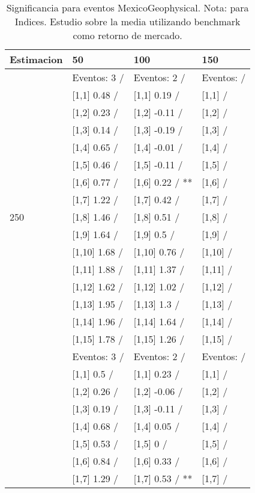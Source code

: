 \begin{table}

\caption{Significancia para eventos MexicoGeophysical. Nota: para Indices. Estudio sobre la media utilizando benchmark como retorno de mercado.}
\centering
\begin{tabular}[t]{llll}
\toprule
Estimacion & 50 & 100 & 150\\
\midrule
 & Eventos:  3 / & Eventos:  2 / & Eventos:   /\\
 & {}[1,1] 0.48  / & {}[1,1] 0.19  / & {}[1,1]  /\\
 & {}[1,2] 0.23  / & {}[1,2] -0.11  / & {}[1,2]  /\\
 & {}[1,3] 0.14  / & {}[1,3] -0.19  / & {}[1,3]  /\\
 & {}[1,4] 0.65  / & {}[1,4] -0.01  / & {}[1,4]  /\\
\addlinespace
 & {}[1,5] 0.46  / & {}[1,5] -0.11  / & {}[1,5]  /\\
 & {}[1,6] 0.77  / & {}[1,6] 0.22  / ** & {}[1,6]  /\\
 & {}[1,7] 1.22  / & {}[1,7] 0.42  / & {}[1,7]  /\\
250 & {}[1,8] 1.46  / & {}[1,8] 0.51  / & {}[1,8]  /\\
 & {}[1,9] 1.64  / & {}[1,9] 0.5  / & {}[1,9]  /\\
\addlinespace
 & {}[1,10] 1.68  / & {}[1,10] 0.76  / & {}[1,10]  /\\
 & {}[1,11] 1.88  / & {}[1,11] 1.37  / & {}[1,11]  /\\
 & {}[1,12] 1.62  / & {}[1,12] 1.02  / & {}[1,12]  /\\
 & {}[1,13] 1.95  / & {}[1,13] 1.3  / & {}[1,13]  /\\
 & {}[1,14] 1.96  / & {}[1,14] 1.64  / & {}[1,14]  /\\
\addlinespace
 & {}[1,15] 1.78  / & {}[1,15] 1.26  / & {}[1,15]  /\\
 & Eventos:  3 / & Eventos:  2 / & Eventos:   /\\
 & {}[1,1] 0.5  / & {}[1,1] 0.23  / & {}[1,1]  /\\
 & {}[1,2] 0.26  / & {}[1,2] -0.06  / & {}[1,2]  /\\
 & {}[1,3] 0.19  / & {}[1,3] -0.11  / & {}[1,3]  /\\
\addlinespace
 & {}[1,4] 0.68  / & {}[1,4] 0.05  / & {}[1,4]  /\\
 & {}[1,5] 0.53  / & {}[1,5] 0  / & {}[1,5]  /\\
 & {}[1,6] 0.84  / & {}[1,6] 0.33  / & {}[1,6]  /\\
 & {}[1,7] 1.29  / & {}[1,7] 0.53  / ** & {}[1,7]  /\\

\end{tabular}
\end{table}
